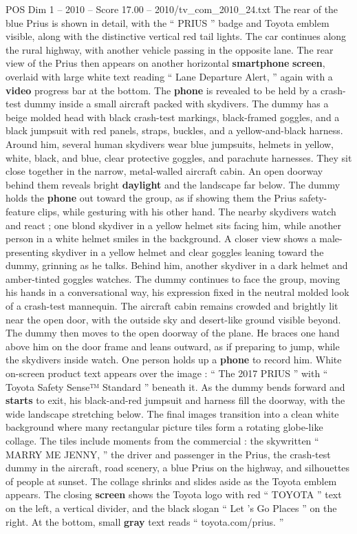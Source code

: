 \begin{textsample}{POS Dim 1 – 2010 – Score 17.00 – 2010/tv\_com\_2010\_24.txt}
The rear of the blue Prius is shown in detail, with the “ PRIUS ” badge and Toyota emblem visible, along with the distinctive vertical red tail lights.
The car continues along the rural highway, with another vehicle passing in the opposite lane.
The rear view of the Prius then appears on another horizontal \textbf{smartphone} \textbf{screen}, overlaid with large white text reading “ Lane Departure Alert, ” again with a \textbf{video} progress bar at the bottom.
The \textbf{phone} is revealed to be held by a crash-test dummy inside a small aircraft packed with skydivers.
The dummy has a beige molded head with black crash-test markings, black-framed goggles, and a black jumpsuit with red panels, straps, buckles, and a yellow-and-black harness.
Around him, several human skydivers wear blue jumpsuits, helmets in yellow, white, black, and blue, clear protective goggles, and parachute harnesses.
They sit close together in the narrow, metal-walled aircraft cabin.
An open doorway behind them reveals bright \textbf{daylight} and the landscape far below.
The dummy holds the \textbf{phone} out toward the group, as if showing them the Prius safety-feature clips, while gesturing with his other hand.
The nearby skydivers watch and react ; one blond skydiver in a yellow helmet sits facing him, while another person in a white helmet smiles in the background.
A closer view shows a male-presenting skydiver in a yellow helmet and clear goggles leaning toward the dummy, grinning as he talks.
Behind him, another skydiver in a dark helmet and amber-tinted goggles watches.
The dummy continues to face the group, moving his hands in a conversational way, his expression fixed in the neutral molded look of a crash-test mannequin.
The aircraft cabin remains crowded and brightly lit near the open door, with the outside sky and desert-like ground visible beyond.
The dummy then moves to the open doorway of the plane.
He braces one hand above him on the door frame and leans outward, as if preparing to jump, while the skydivers inside watch.
One person holds up a \textbf{phone} to record him.
White on-screen product text appears over the image : “ The 2017 PRIUS ” with “ Toyota Safety Sense{\EmojiFont ™} Standard ” beneath it.
As the dummy bends forward and \textbf{starts} to exit, his black-and-red jumpsuit and harness fill the doorway, with the wide landscape stretching below.
The final images transition into a clean white background where many rectangular picture tiles form a rotating globe-like collage.
The tiles include moments from the commercial : the skywritten “ MARRY ME JENNY, ” the driver and passenger in the Prius, the crash-test dummy in the aircraft, road scenery, a blue Prius on the highway, and silhouettes of people at sunset.
The collage shrinks and slides aside as the Toyota emblem appears.
The closing \textbf{screen} shows the Toyota logo with red “ TOYOTA ” text on the left, a vertical divider, and the black slogan “ Let ’s Go Places ” on the right.
At the bottom, small \textbf{gray} text reads “ toyota.com/prius. ”

\end{textsample}
